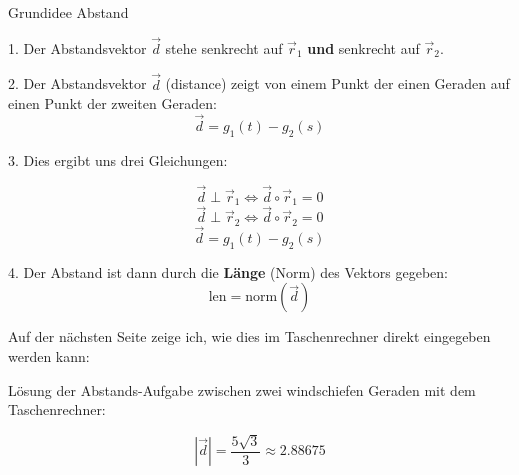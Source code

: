 \begin{rezept}{Grundidee Abstand}{}

  1. Der Abstandsvektor $\vec{d}$ stehe senkrecht auf $\vec{r}_1$
  \textbf{und} senkrecht auf $\vec{r}_2$.

  2. Der Abstandsvektor $\vec{d}$ (distance) zeigt von einem Punkt der einen Geraden auf
  einen Punkt der zweiten Geraden: $$\vec{d}=g_1(t)-g_2(s)$$

  3. Dies ergibt uns drei Gleichungen:

  $$\vec{d}\perp\vec{r}_1 \Longleftrightarrow{}  \vec{d}\circ{}\vec{r}_1 = 0$$
  $$\vec{d}\perp\vec{r}_2 \Longleftrightarrow{} \vec{d}\circ{}\vec{r}_2 = 0$$
  $$\vec{d}=g_1(t)-g_2(s)$$

  4. Der Abstand ist dann durch die \textbf{Länge} (Norm) des Vektors gegeben:
  $$\text{len} = \text{norm}(\vec{d})$$
  
\end{rezept}

Auf der nächsten Seite zeige ich, wie dies im Taschenrechner direkt
eingegeben werden kann:
\newpage

Lösung der Abstands-Aufgabe zwischen zwei windschiefen Geraden mit dem
Taschenrechner:
\TRAINER{}


$$|\vec{d}| = \frac{5\sqrt{3}}{3} \approx 2.88675$$
\newpage

